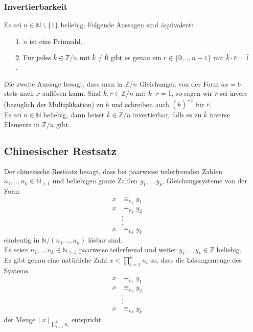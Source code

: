 \subsubsection{Invertierbarkeit}
Es sei $n\in\mathbb{N}\backslash\{1\}$ beliebig. Folgende Aussagen sind äquivalent:
\begin{enumerate}
\item[1.] $n$ ist eine Primzahl.
\item[2.] Für jedes $\bar k\in\mathbb{Z}/n$ mit $\bar k\neq\bar 0$ gibt es genau ein $r\in\{0,..,n-1\}$ mit $\bar k\cdot\bar r=\bar 1$.
\end{enumerate}
Die zweite Aussage besagt, dass man in $\mathbb{Z}/n$ Gleichungen von der Form $ax=b$ stets nach $x$ auflösen kann. Sind $\bar k,\bar r\in\mathbb{Z}/n$ mit $\bar k\cdot\bar r=\bar 1$, so sagen wir $\bar r$ sei invers (bezüglich der Multiplikation) zu $\bar k$ und schreiben auch $(\bar{k})^{-1}$ für $\bar r$.
\\
Es sei $n\in\mathbb{N}$ beliebig, dann heisst $\bar k\in\mathbb{Z}/n$ invertierbar, falls es zu $\bar k$ inverse Elemente in $\mathbb{Z}/n$ gibt.

\subsection{Chinesischer Restsatz}
Der chinesische Restsatz besagt, dass bei paarwiese teilerfremden Zahlen $n_1,..,n_k\in\mathbb{N}_{>1}$ und beliebigen ganze Zahlen $y_1,..,y_k$, Gleichungssysteme von der Form
\begin{align*}
 x&\equiv_{n_1} y_1\\
x&\equiv_{n_2} y_2\\
&.\\
&.\\
&.\\
x&\equiv_{n_k} y_k
\end{align*}
eindeutig in $\mathbb{N}/(n_1,..,n_k)$ lösbar sind.
\\

Es seien $n_1,..,n_k\in\mathbb{N}_{>1}$ paarweise teilerfremd und weiter $y_1,..,y_k\in\mathbb{Z}$ beliebig. Es gibt genau eine natürliche Zahl $x<\prod_{i=1}^kn_i$ so, dass die Lösungsmenge des Systems
\begin{align*}
 x&\equiv_{n_1} y_1\\
x&\equiv_{n_2} y_2\\
&.\\
&.\\
&.\\
x&\equiv_{n_k} y_k
\end{align*}
der Menge $[x]_{\prod_{i=1}^kn_i}$ entspricht.

